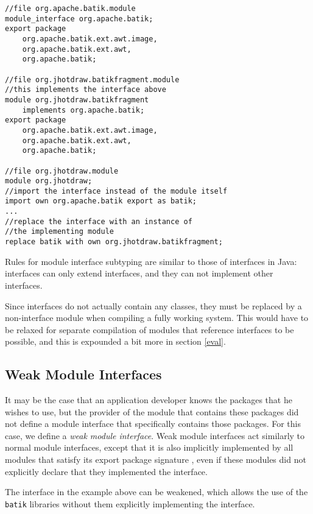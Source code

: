 \begin{lstlisting}[caption=Module Interfaces]
//file org.apache.batik.module
module_interface org.apache.batik;
export package 
	org.apache.batik.ext.awt.image,
	org.apache.batik.ext.awt,
	org.apache.batik;

//file org.jhotdraw.batikfragment.module
//this implements the interface above
module org.jhotdraw.batikfragment 
	implements org.apache.batik;
export package 
	org.apache.batik.ext.awt.image,
	org.apache.batik.ext.awt,
	org.apache.batik;

//file org.jhotdraw.module
module org.jhotdraw;
//import the interface instead of the module itself
import own org.apache.batik export as batik;
...
//replace the interface with an instance of
//the implementing module
replace batik with own org.jhotdraw.batikfragment; 
\end{lstlisting}

Rules for module interface subtyping are similar to those of interfaces in Java:
interfaces can only extend interfaces, and they can not implement other
interfaces. 

Since interfaces do not actually contain any classes, they must be replaced
by a non-interface module when compiling a fully working system. This would
have to be relaxed for separate compilation of modules that reference interfaces
to be possible, and this is expounded a bit more in section \ref{eval}.

\subsection{Weak Module Interfaces}

It may be the case that an application developer knows the packages that
he wishes to use, but the provider of the module that contains these packages 
did not define a module interface that specifically contains those packages. For
this case, we define a \textit{weak module interface}. Weak module interfaces act similarly
to normal module interfaces, except that it is also implicitly implemented
by all modules that satisfy its export package signature \cite{mcdirmid01jiazzi, componentnextgen}, 
even if these modules did not explicitly declare that they implemented the interface.

The interface in the example above can be weakened, which allows the use
of the \texttt{batik} libraries without them explicitly implementing the interface.

